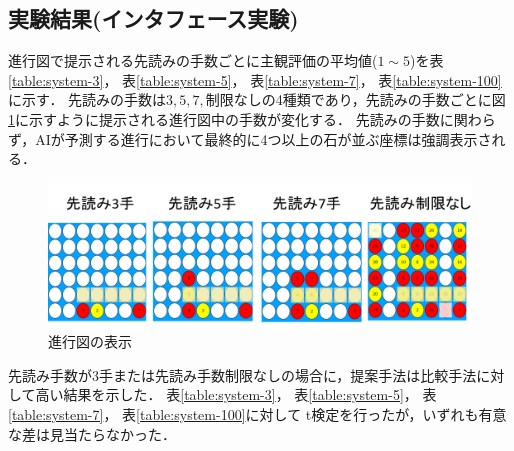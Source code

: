 \subsection{実験結果(インタフェース実験)}
進行図で提示される先読みの手数ごとに主観評価の平均値($1\sim5$)を表\ref{table:system-3}， 表\ref{table:system-5}， 表\ref{table:system-7}， 表\ref{table:system-100}に示す．
先読みの手数は${3, 5, 7, \textrm{制限なし}}$の4種類であり，先読みの手数ごとに図\ref{fig:see}に示すように提示される進行図中の手数が変化する．
先読みの手数に関わらず，AIが予測する進行において最終的に4つ以上の石が並ぶ座標は強調表示される．
\begin{figure}[t]
    \centering
    \includegraphics[width=\linewidth]{./figure/see.png}
	\caption{進行図の表示}
	\label{fig:see}
\end{figure}
先読み手数が3手または先読み手数制限なしの場合に，提案手法は比較手法に対して高い結果を示した．
表\ref{table:system-3}， 表\ref{table:system-5}， 表\ref{table:system-7}， 表\ref{table:system-100}に対して
t検定を行ったが，いずれも有意な差は見当たらなかった．
\begin{table}[H]
    \caption{先読み手数３手の場合(インタフェース実験)}
    \label{table:system-3}
    \scriptsize
    \centering
    
\end{table}
